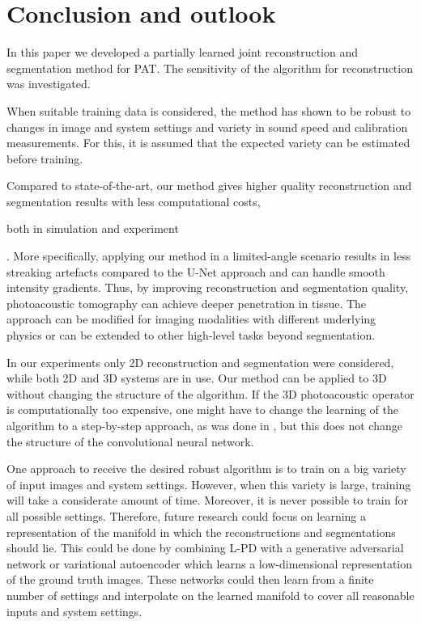 \documentclass[journal]{IEEEtran}
\newcommand{\hl}[1]{\cbcolor{red}\begin{changebar}{\color{red} #1}\end{changebar}}
\begin{document}
\section{Conclusion and outlook}\label{sec:conclusion}
In this paper we developed a partially learned joint reconstruction and segmentation method for PAT. The sensitivity of the algorithm for reconstruction was investigated. \hl{When suitable training data is considered, the method has shown to be robust to changes in image and system settings and variety in sound speed and calibration measurements. For this, it is assumed that the expected variety can be estimated before training.} Compared to state-of-the-art, our method gives higher quality reconstruction and segmentation results with less computational costs, \hl{both in simulation and experiment}. More specifically, applying our method in a limited-angle scenario results in less streaking artefacts compared to the U-Net approach and can handle smooth intensity gradients. Thus, by improving reconstruction and segmentation quality, photoacoustic tomography can achieve deeper penetration in tissue. The approach can be modified for imaging modalities with different underlying physics or can be extended to other high-level tasks beyond segmentation.

In our experiments only 2D reconstruction and segmentation were considered, while both 2D \cite{Li2018} and 3D systems \cite{Toi2017} are in use. Our method can be applied to 3D without changing the structure of the algorithm. If the 3D photoacoustic operator is computationally too expensive, one might have to change the learning of the algorithm to a step-by-step approach, as was done in \cite{Hauptmann2018}, but this does not change the structure of the convolutional neural network.

One approach to receive the desired robust algorithm is to train on a big variety of input images and system settings. However, when this variety is large, training will take a considerate amount of time. Moreover, it is never possible to train for all possible settings. Therefore, future research could focus on learning a representation of the manifold in which the reconstructions and segmentations should lie. This could be done by combining L-PD with a generative adversarial network \cite{Goodfellow2014} or variational autoencoder \cite{Kingma2013} which learns a low-dimensional representation of the ground truth images. These networks could then learn from a finite number of settings and interpolate on the learned manifold to cover all reasonable inputs and system settings. 
\end{document}
